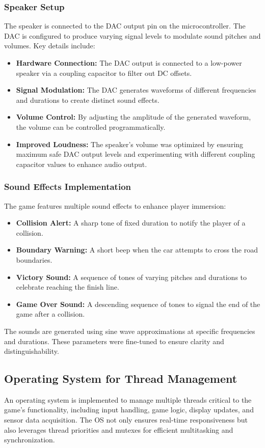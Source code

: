 \documentclass[conference]{IEEEtran}
\begin{document}
\subsubsection{Speaker Setup}
The speaker is connected to the DAC output pin on the microcontroller. The DAC is configured to produce varying signal levels to modulate sound pitches and volumes. Key details include:
\begin{itemize}
    \item \textbf{Hardware Connection:} The DAC output is connected to a low-power speaker via a coupling capacitor to filter out DC offsets.
    \item \textbf{Signal Modulation:} The DAC generates waveforms of different frequencies and durations to create distinct sound effects.
    \item \textbf{Volume Control:} By adjusting the amplitude of the generated waveform, the volume can be controlled programmatically.
    \item \textbf{Improved Loudness:} The speaker's volume was optimized by ensuring maximum safe DAC output levels and experimenting with different coupling capacitor values to enhance audio output.
\end{itemize}

\subsubsection{Sound Effects Implementation}
The game features multiple sound effects to enhance player immersion:
\begin{itemize}
    \item \textbf{Collision Alert:} A sharp tone of fixed duration to notify the player of a collision.
    \item \textbf{Boundary Warning:} A short beep when the car attempts to cross the road boundaries.
    \item \textbf{Victory Sound:} A sequence of tones of varying pitches and durations to celebrate reaching the finish line.
    \item \textbf{Game Over Sound:} A descending sequence of tones to signal the end of the game after a collision.
\end{itemize}
The sounds are generated using sine wave approximations at specific frequencies and durations. These parameters were fine-tuned to ensure clarity and distinguishability.

\subsection{Operating System for Thread Management}  
An operating system is implemented to manage multiple threads critical to the game's functionality, including input handling, game logic, display updates, and sensor data acquisition. The OS not only ensures real-time responsiveness but also leverages thread priorities and mutexes for efficient multitasking and synchronization.  
\end{document}
